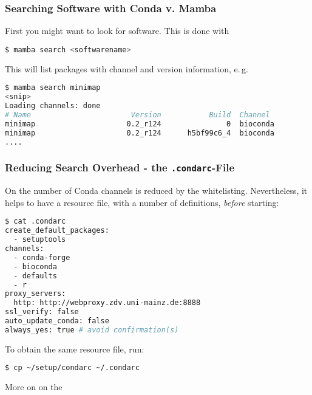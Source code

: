\begin{frame}[fragile]
  \frametitle{Searching Software with Conda v. Mamba}
  First you might want to look for software. This is done with
  \begin{lstlisting}[language=Bash, style=Shell]
$ mamba search <softwarename>
  \end{lstlisting}
  \pause
  \pause
  This will list packages with channel and version information, e.\,g.
  \begin{lstlisting}[language=Bash, style=Shell, basicstyle=\tiny]
$ mamba search minimap
<snip>
Loading channels: done
# Name                       Version           Build  Channel             
minimap                     0.2_r124               0  bioconda            
minimap                     0.2_r124      h5bf99c6_4  bioconda
....
  \end{lstlisting}
\end{frame}

\begin{frame}[fragile]
  \frametitle{Reducing Search Overhead - the \texttt{.condarc}-File}
  On \mogon{} the number of Conda channels is reduced by the whitelisting. Nevertheless, it helps to have a resource file, with a number of definitions, \emph{before} starting:
  \begin{lstlisting}[language=Bash, style=Shell, basicstyle=\tiny]
$ cat .condarc
create_default_packages:
  - setuptools
channels:
  - conda-forge
  - bioconda
  - defaults
  - r
proxy_servers:
  http: http://webproxy.zdv.uni-mainz.de:8888
ssl_verify: false
auto_update_conda: false
always_yes: true # avoid confirmation(s)
  \end{lstlisting}
  To obtain the same resource file, run:
  \begin{lstlisting}[language=Bash, style=Shell, basicstyle=\footnotesize]
$ cp ~/setup/condarc ~/.condarc
  \end{lstlisting}
  More on  on the 
\end{frame}

